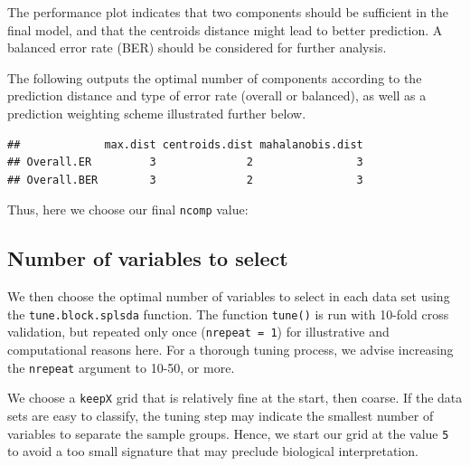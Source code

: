 \documentclass[]{book}
\newenvironment{Shaded}{\begin{snugshade}}{\end{snugshade}}
\newcommand{\NormalTok}[1]{#1}
\newcommand{\OperatorTok}[1]{\textcolor[rgb]{0.81,0.36,0.00}{\textbf{#1}}}
\newcommand{\StringTok}[1]{\textcolor[rgb]{0.31,0.60,0.02}{#1}}
\begin{document}
The performance plot indicates that two components should be sufficient in the final model, and that the centroids distance might lead to better prediction. A balanced error rate (BER) should be considered for further analysis.

The following outputs the optimal number of components according to the prediction distance and type of error rate (overall or balanced), as well as a prediction weighting scheme illustrated further below.

\begin{Shaded}
\end{Shaded}

\begin{verbatim}
##             max.dist centroids.dist mahalanobis.dist
## Overall.ER         3              2                3
## Overall.BER        3              2                3
\end{verbatim}

Thus, here we choose our final \texttt{ncomp} value:

\begin{Shaded}
\end{Shaded}

\hypertarget{diablo:numvar}{%
\subsection{Number of variables to select}\label{diablo:numvar}}

We then choose the optimal number of variables to select in each data set using the \texttt{tune.block.splsda} function. The function \texttt{tune()} is run with 10-fold cross validation, but repeated only once (\texttt{nrepeat\ =\ 1}) for illustrative and computational reasons here. For a thorough tuning process, we advise increasing the \texttt{nrepeat} argument to 10-50, or more.

We choose a \texttt{keepX} grid that is relatively fine at the start, then coarse. If the data sets are easy to classify, the tuning step may indicate the smallest number of variables to separate the sample groups. Hence, we start our grid at the value \texttt{5} to avoid a too small signature that may preclude biological interpretation.
\end{document}
